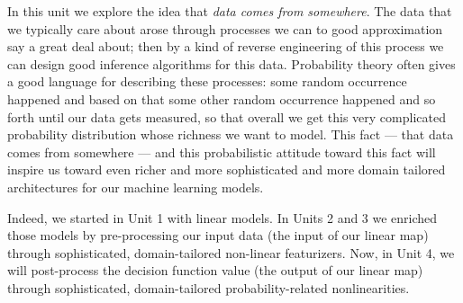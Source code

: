 

%
%
In this unit we explore the idea that \emph{data comes from somewhere}.  The data that
we typically care about arose through processes we can to good approximation say a
great deal about; then by a kind of reverse engineering of this process we can
design good inference algorithms for this data.  Probability theory often
gives a good language for describing these processes: some random occurrence
happened and based on that some other random occurrence happened and so forth
until our data gets measured, so that overall we get this very complicated
probability distribution whose richness we want to model.
%
This fact --- that data comes from somewhere --- and this probabilistic
attitude toward this fact will inspire us toward even richer and more
sophisticated and more domain tailored architectures for our machine learning
models.

Indeed, we started in Unit 1 with linear models.  In Units 2 and 3 we enriched
those models by pre-processing our input data (the input of our linear map)
through sophisticated, domain-tailored non-linear featurizers.  Now, in Unit 4,
we will post-process the decision function value (the output of our linear map)
through sophisticated, domain-tailored probability-related nonlinearities.


